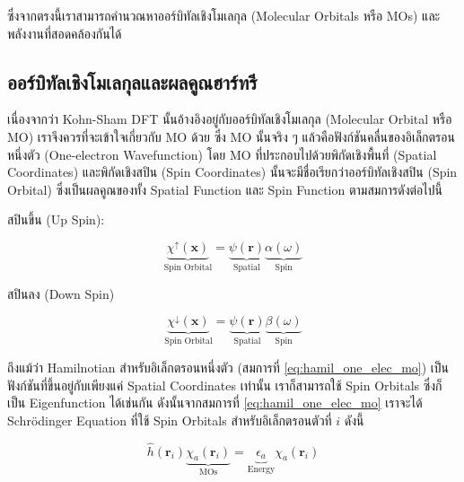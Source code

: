 \noindent ซึ่งจากตรงนี้เราสามารถคำนวณหาออร์บิทัลเชิงโมเลกุล (Molecular Orbitals หรือ MOs) และพลังงานที่สอดคล้องกันได้

\subsection{ออร์บิทัลเชิงโมเลกุลและผลคูณฮาร์ทรี}
\label{ssec:mol_orb_hartree_prod}

เนื่องจากว่า Kohn-Sham DFT นั้นอ้างอิงอยู่กับออร์บิทัลเชิงโมเลกุล (Molecular Orbital หรือ MO) เราจึงควรที่จะเข้าใจเกี่ยวกับ MO ด้วย ซึ่ง 
MO นั้นจริง ๆ แล้วคือฟังก์ชันคลื่นของอิเล็กตรอนหนึ่งตัว (One-electron Wavefunction) โดย MO ที่ประกอบไปด้วยพิกัดเชิงพื้นที่ (Spatial 
Coordinates) และพิกัดเชิงสปิน (Spin Coordinates) นั้นจะมีชื่อเรียกว่าออร์บิทัลเชิงสปิน (Spin Orbital) ซึ่งเป็นผลคูณของทั้ง 
Spatial Function และ Spin Function ตามสมการดังต่อไปนี้

\noindent สปินขึ้น (Up Spin):

\begin{equation}\label{eq:hamil_spin_orb_up}
    \underbrace{\chi^{\uparrow}(\bm{x})}_{\text{Spin Orbital}} = 
    \underbrace{\psi(\bm{r})}_{\text{Spatial}} \underbrace{\alpha(\omega)}_{\text{Spin}}
\end{equation}

\noindent สปินลง (Down Spin)

\begin{equation}\label{eq:hamil_spin_orb_down}
    \underbrace{\chi^{\downarrow}(\bm{x})}_{\text{Spin Orbital}} = 
    \underbrace{\psi(\bm{r})}_{\text{Spatial}} \underbrace{\beta(\omega)}_{\text{Spin}}
\end{equation}

\noindent ถึงแม้ว่า Hamilnotian สำหรับอิเล็กตรอนหนึ่งตัว (สมการที่ \ref{eq:hamil_one_elec_mo}) เป็นฟังก์ชันที่ขึ้นอยู่กับเพียงแค่
Spatial Coordinates เท่านั้น เราก็สามารถใช้ Spin Orbitals ซึ่งก็เป็น Eigenfunction ได้เช่นกัน ดังนั้นจากสมการที่ 
\ref{eq:hamil_one_elec_mo} เราจะได้ Schr\"{o}dinger Equation ที่ใช้ Spin Orbitals สำหรับอิเล็กตรอนตัวที่ $i$ ดังนี้

\begin{equation}\label{eq:hamil_spin_orb}
    \hat{h}(\bm{r}_{i}) \underbrace{\chi_{a}(\bm{r}_{i})}_{\text{MOs}} = 
    \underbrace{\epsilon_{a}}_{\text{Energy}} \chi_{a}(\bm{r}_{i})
\end{equation}

